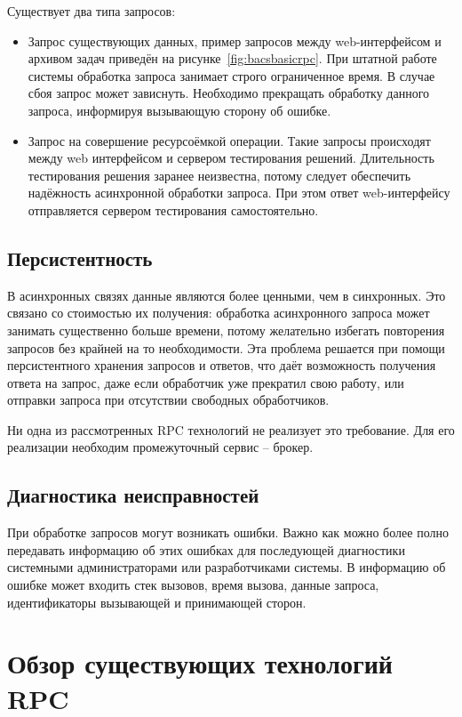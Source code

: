 Существует два типа запросов:
\begin{itemize}
    \item Запрос существующих данных, пример запросов между web-интерфейсом и
        архивом задач приведён на рисунке~\ref{fig:bacsbasicrpc}.
        При штатной работе системы обработка запроса занимает строго
        ограниченное время. В случае сбоя запрос может зависнуть.
        Необходимо прекращать обработку данного запроса,
        информируя вызывающую сторону об ошибке.
    \item Запрос на совершение ресурсоёмкой операции. Такие запросы происходят
        между web интерфейсом и сервером тестирования решений.
        Длительность тестирования решения заранее неизвестна, потому следует
        обеспечить надёжность асинхронной обработки запроса. При этом ответ
        web-интерфейсу отправляется сервером тестирования самостоятельно.
\end{itemize}

\subsection{Персистентность}
В асинхронных связях данные являются более ценными, чем в синхронных.
Это связано со стоимостью их получения: обработка асинхронного запроса
может занимать существенно больше времени, потому желательно избегать
повторения запросов без крайней на то необходимости. Эта проблема решается
при помощи персистентного хранения запросов и ответов, что даёт возможность
получения ответа на запрос, даже если обработчик уже прекратил свою работу,
или отправки запроса при отсутствии свободных обработчиков.

Ни одна из рассмотренных RPC технологий не реализует это требование.
Для его реализации необходим промежуточный сервис -- брокер.

\subsection{Диагностика неисправностей}
При обработке запросов могут возникать ошибки. Важно как можно более полно
передавать информацию об этих ошибках для последующей диагностики системными
администраторами или разработчиками системы. В информацию об ошибке может
входить стек вызовов, время вызова, данные запроса, идентификаторы вызывающей
и принимающей сторон.

\section{Обзор существующих технологий RPC}
